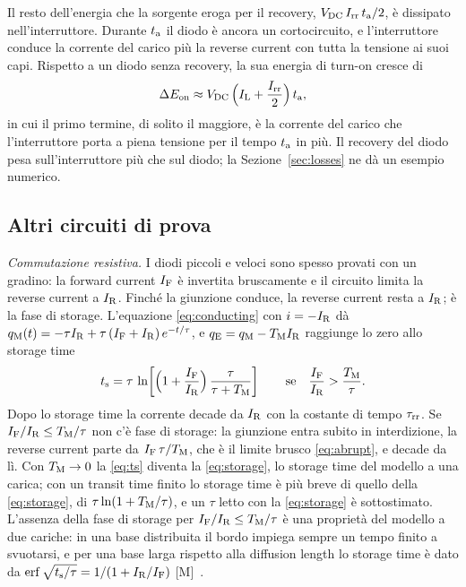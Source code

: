 \documentclass[10pt,a4paper]{scrartcl}
\let\newcommand\pdvaluedefine
\newcommand{\IF}{I_\mathrm{F}}
\newcommand{\IR}{I_\mathrm{R}}
\newcommand{\Irr}{I_\mathrm{rr}}
\newcommand{\ta}{t_\mathrm{a}}
\newcommand{\ts}{t_\mathrm{s}}
\newcommand{\taurr}{\tau_\mathrm{rr}}
\newcommand{\TM}{T_\mathrm{M}}
\newcommand{\qE}{q_\mathrm{E}}
\newcommand{\qM}{q_\mathrm{M}}
\newcommand{\Vdc}{V_\mathrm{DC}}
\begin{document}
Il resto dell'energia che la sorgente eroga per il recovery, $\Vdc\,\Irr\,\ta/2$, è dissipato nell'interruttore. Durante $\ta$ il diodo è ancora un cortocircuito, e l'interruttore conduce la corrente del carico più la reverse current con tutta la tensione ai suoi capi. Rispetto a un diodo senza recovery, la sua energia di turn-on cresce di
\begin{equation}
\Delta E_\mathrm{on} \approx \Vdc\,\Bigl(I_\mathrm{L} + \frac{\Irr}{2}\Bigr)\,\ta ,
\label{eq:eon}
\end{equation}
in cui il primo termine, di solito il maggiore, è la corrente del carico che l'interruttore porta a piena tensione per il tempo $\ta$ in più. Il recovery del diodo pesa sull'interruttore più che sul diodo; la Sezione~\ref{sec:losses} ne dà un esempio numerico.
\subsection{Altri circuiti di prova}
\label{sec:othertests}
\emph{Commutazione resistiva.} I diodi piccoli e veloci sono spesso provati con un gradino: la forward current $\IF$ è invertita bruscamente e il circuito limita la reverse current a $\IR$. Finché la giunzione conduce, la reverse current resta a $\IR$; è la fase di storage. L'equazione \eqref{eq:conducting} con $i = -\IR$ dà $\qM(t) = -\tau\IR + \tau\,(\IF+\IR)\,e^{-t/\tau}$, e $\qE = \qM - \TM\IR$ raggiunge lo zero allo storage time
\begin{equation}
\ts = \tau\,\ln\!\left[\Bigl(1+\frac{\IF}{\IR}\Bigr)\,\frac{\tau}{\tau+\TM}\right] \qquad \text{se} \quad \frac{\IF}{\IR} > \frac{\TM}{\tau} .
\label{eq:ts}
\end{equation}
Dopo lo storage time la corrente decade da $\IR$ con la costante di tempo $\taurr$. Se $\IF/\IR \leq \TM/\tau$ non c'è fase di storage: la giunzione entra subito in interdizione, la reverse current parte da $\IF\,\tau/\TM$, che è il limite brusco \eqref{eq:abrupt}, e decade da lì. Con $\TM \to 0$ la \eqref{eq:ts} diventa la \eqref{eq:storage}, lo storage time del modello a una carica; con un transit time finito lo storage time è più breve di quello della \eqref{eq:storage}, di $\tau\ln(1+\TM/\tau)$, e un $\tau$ letto con la \eqref{eq:storage} è sottostimato. L'assenza della fase di storage per $\IF/\IR \leq \TM/\tau$ è una proprietà del modello a due cariche: in una base distribuita il bordo impiega sempre un tempo finito a svuotarsi, e per una base larga rispetto alla diffusion length lo storage time è dato da $\operatorname{erf}\sqrt{\ts/\tau} = 1/(1+\IR/\IF)$ [M]~\cite{sze}.
\end{document}
